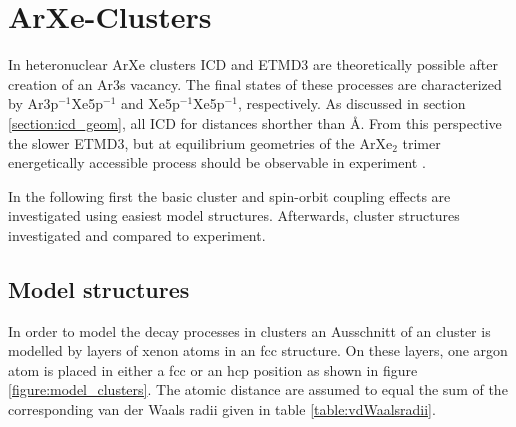 \section{ArXe-Clusters}
In heteronuclear ArXe clusters \ac{ICD} and \ac{ETMD}3 are theoretically
possible after creation of an Ar3s vacancy. The final states of these processes
are characterized by Ar3p$^{-1}$Xe5p$^{-1}$ and Xe5p$^{-1}$Xe5p$^{-1}$,
respectively. As discussed in section \ref{section:icd_geom}, all \ac{ICD}
for distances shorther than \unit[10]{\AA}. From this perspective the
slower \ac{ETMD}3, but at equilibrium geometries
of the ArXe$_2$ trimer energetically accessible process should be
observable in experiment \cite{Fasshauer10}. 

In the following first the basic cluster and spin-orbit coupling effects
are investigated using easiest model
structures. Afterwards, cluster structures investigated and compared to experiment.


\subsection{Model structures}
In order to model the decay processes in clusters an Ausschnitt of an cluster
is modelled by layers of xenon atoms in an \ac{fcc} structure. On these
layers, one argon atom is placed in either a \ac{fcc} or an \ac{hcp} position
as shown in figure \ref{figure:model_clusters}. The atomic distance are
assumed to equal the sum of the corresponding van der Waals radii given in
table \ref{table:vdWaalsradii}.

